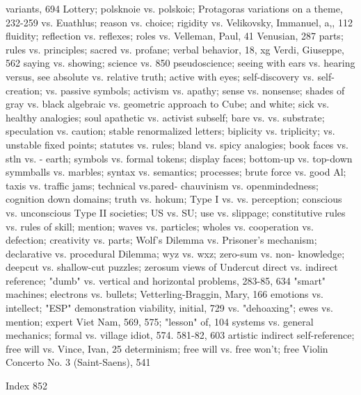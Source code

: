 variants, 694                                        Lottery; polsknoie vs. polskoic; Protagoras
variations on a theme, 232-259                       vs. Euathlus; reason vs. choice; rigidity vs.
Velikovsky, Immanuel, a,, 112                        fluidity; reflection vs. reflexes; roles vs.
Velleman, Paul, 41 Venusian, 287                     parts; rules vs. principles; sacred vs. profane;
verbal behavior, 18, xg Verdi, Giuseppe, 562         saying vs. showing; science vs.
 850                                                 pseudoscience; seeing with ears vs. hearing
versus, see absolute vs. relative truth; active      with eyes; self-discovery vs. self-creation;
 vs. passive symbols; activism vs. apathy;           sense vs. nonsense; shades of gray vs. black
 algebraic vs. geometric approach to Cube;           and white; sick vs. healthy analogies; soul
 apathetic vs. activist subself; bare vs.            vs. substrate; speculation vs. caution; stable
 renormalized letters; biplicity vs. triplicity;     vs. unstable fixed points; statutes vs. rules;
 bland vs. spicy analogies; book faces vs.           stln vs. - earth; symbols vs. formal tokens;
 display faces; bottom-up vs. top-down               symmballs vs. marbles; syntax vs. semantics;
 processes; brute force vs. good Al;                 taxis vs. traffic jams; technical vs.pared-
 chauvinism vs. openmindedness; cognition            down domains; truth vs. hokum; Type I vs.
 vs. perception; conscious vs. unconscious           Type II societies; US vs. SU; use vs.
 slippage; constitutive rules vs. rules of skill;    mention; waves vs. particles; wholes vs.
 cooperation vs. defection; creativity vs.           parts; Wolf's Dilemma vs. Prisoner's
 mechanism; declarative vs. procedural               Dilemma; wyz vs. wxz; zero-sum vs. non-
 knowledge; deepcut vs. shallow-cut puzzles;         zerosum views of Undercut
 direct vs. indirect reference; "dumb" vs.          vertical and horizontal problems, 283-85, 634
 "smart" machines; electrons vs. bullets;           Vetterling-Braggin, Mary, 166
 emotions vs. intellect; "ESP" demonstration        viability, initial, 729
 vs. "dehoaxing"; ewes vs. mention; expert          Viet Nam, 569, 575; "lesson" of, 104
 systems vs. general mechanics; formal vs.          village idiot, 574. 581-82, 603
 artistic indirect self-reference; free will vs.    Vince, Ivan, 25
 determinism; free will vs. free won't; free        Violin Concerto No. 3 (Saint-Saens), 541

 Index                                                                                            852

